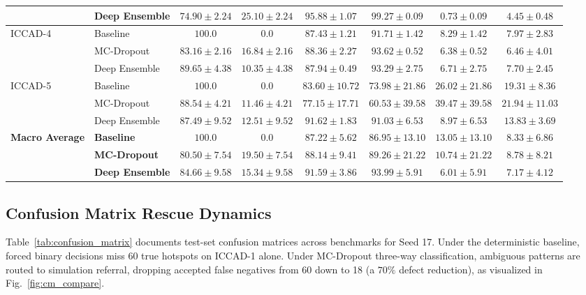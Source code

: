 \documentclass[11pt,journal,onecolumn]{IEEEtran}
\begin{document}
\begin{table}[htbp]
{\begin{tabular}{llcccccc}
& Deep Ensemble & $74.90 \pm 2.24$ & $25.10 \pm 2.24$ & $95.88 \pm 1.07$ & $99.27 \pm 0.09$ & $0.73 \pm 0.09$ & $4.45 \pm 0.48$ \\
\midrule
\multirow{3}{*}{ICCAD-4} 
& Baseline & $100.0$ & $0.0$ & $87.43 \pm 1.21$ & $91.71 \pm 1.42$ & $8.29 \pm 1.42$ & $7.97 \pm 2.83$ \\
& MC-Dropout & $83.16 \pm 2.16$ & $16.84 \pm 2.16$ & $88.36 \pm 2.27$ & $93.62 \pm 0.52$ & $6.38 \pm 0.52$ & $6.46 \pm 4.01$ \\
& Deep Ensemble & $89.65 \pm 4.38$ & $10.35 \pm 4.38$ & $87.94 \pm 0.49$ & $93.29 \pm 2.75$ & $6.71 \pm 2.75$ & $7.70 \pm 2.45$ \\
\midrule
\multirow{3}{*}{ICCAD-5} 
& Baseline & $100.0$ & $0.0$ & $83.60 \pm 10.72$ & $73.98 \pm 21.86$ & $26.02 \pm 21.86$ & $19.31 \pm 8.36$ \\
& MC-Dropout & $88.54 \pm 4.21$ & $11.46 \pm 4.21$ & $77.15 \pm 17.71$ & $60.53 \pm 39.58$ & $39.47 \pm 39.58$ & $21.94 \pm 11.03$ \\
& Deep Ensemble & $87.49 \pm 9.52$ & $12.51 \pm 9.52$ & $91.62 \pm 1.83$ & $91.03 \pm 6.53$ & $8.97 \pm 6.53$ & $13.83 \pm 3.69$ \\
\midrule
\textbf{Macro Average} 
& \textbf{Baseline} & $\mathbf{100.0}$ & $\mathbf{0.0}$ & $\mathbf{87.22 \pm 5.62}$ & $\mathbf{86.95 \pm 13.10}$ & $\mathbf{13.05 \pm 13.10}$ & $\mathbf{8.33 \pm 6.86}$ \\
& \textbf{MC-Dropout} & $\mathbf{80.50 \pm 7.54}$ & $\mathbf{19.50 \pm 7.54}$ & $\mathbf{88.14 \pm 9.41}$ & $\mathbf{89.26 \pm 21.22}$ & $\mathbf{10.74 \pm 21.22}$ & $\mathbf{8.78 \pm 8.21}$ \\
& \textbf{Deep Ensemble} & $\mathbf{84.66 \pm 9.58}$ & $\mathbf{15.34 \pm 9.58}$ & $\mathbf{91.59 \pm 3.86}$ & $\mathbf{93.99 \pm 5.91}$ & $\mathbf{6.01 \pm 5.91}$ & $\mathbf{7.17 \pm 4.12}$ \\
\bottomrule
\end{tabular}
}
\end{table}

\subsection{Confusion Matrix Rescue Dynamics}
Table~\ref{tab:confusion_matrix} documents test-set confusion matrices across benchmarks for Seed 17. Under the deterministic baseline, forced binary decisions miss 60 true hotspots on ICCAD-1 alone. Under MC-Dropout three-way classification, ambiguous patterns are routed to simulation referral, dropping accepted false negatives from 60 down to 18 (a $70\%$ defect reduction), as visualized in Fig.~\ref{fig:cm_compare}.
\end{document}
